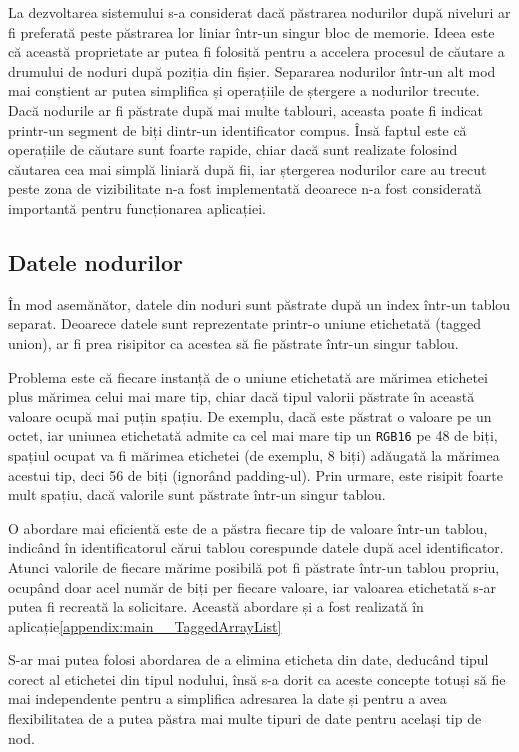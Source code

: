 \documentclass[a4paper,12pt]{report}
\begin{document}
La dezvoltarea sistemului s-a considerat dacă păstrarea nodurilor după niveluri ar fi preferată
peste păstrarea lor liniar într-un singur bloc de memorie.
Ideea este că această proprietate ar putea fi folosită pentru a accelera procesul de căutare
a drumului de noduri după poziția din fișier.
Separarea nodurilor într-un alt mod mai conștient ar putea simplifica
și operațiile de ștergere a nodurilor trecute.
Dacă nodurile ar fi păstrate după mai multe tablouri,
aceasta poate fi indicat printr-un segment de biți dintr-un identificator compus.
Însă faptul este că operațiile de căutare sunt foarte rapide,
chiar dacă sunt realizate folosind căutarea cea mai simplă liniară după fii,
iar ștergerea nodurilor care au trecut peste zona de vizibilitate
n-a fost implementată deoarece n-a fost considerată importantă pentru funcționarea aplicației.

\subsection{Datele nodurilor}

În mod asemănător, datele din noduri sunt păstrate după un index într-un tablou separat.
Deoarece datele sunt reprezentate printr-o uniune etichetată (tagged union),
ar fi prea risipitor ca acestea să fie păstrate într-un singur tablou.

Problema este că fiecare instanță de o uniune etichetată are
mărimea etichetei plus mărimea celui mai mare tip,
chiar dacă tipul valorii păstrate în această valoare ocupă mai puțin spațiu.
De exemplu, dacă este păstrat o valoare pe un octet,
iar uniunea etichetată admite ca cel mai mare tip un \texttt{RGB16} pe 48 de biți,
spațiul ocupat va fi mărimea etichetei (de exemplu, 8 biți) adăugată la mărimea acestui tip,
deci 56 de biți (ignorând padding-ul).
Prin urmare, este risipit foarte mult spațiu, dacă valorile sunt păstrate într-un singur tablou.

O abordare mai eficientă este de a păstra fiecare tip de valoare într-un tablou,
indicând în identificatorul cărui tablou corespunde datele după acel identificator.
Atunci valorile de fiecare mărime posibilă pot fi păstrate într-un tablou propriu,
ocupând doar acel număr de biți per fiecare valoare, 
iar valoarea etichetată s-ar putea fi recreată la solicitare.
Această abordare și a fost realizată în aplicație\ref{appendix:main__TaggedArrayList}

S-ar mai putea folosi abordarea de a elimina eticheta din date,
deducând tipul corect al etichetei din tipul nodului,
însă s-a dorit ca aceste concepte totuși să fie mai independente pentru
a simplifica adresarea la date și pentru a avea flexibilitatea de
a putea păstra mai multe tipuri de date pentru același tip de nod.
\end{document}
